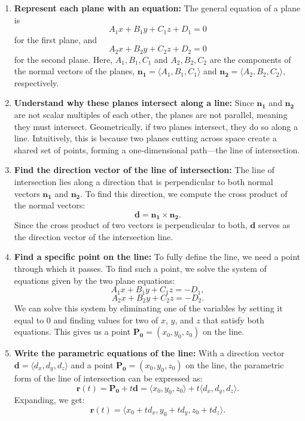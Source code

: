 \begin{enumerate}
    \item \textbf{Represent each plane with an equation:} The general equation of a plane is 
    \[
    A_1 x + B_1 y + C_1 z + D_1 = 0
    \]
    for the first plane, and
    \[
    A_2 x + B_2 y + C_2 z + D_2 = 0
    \]
    for the second plane. Here, \( A_1, B_1, C_1 \) and \( A_2, B_2, C_2 \) are the components of the normal vectors of the planes, \( \mathbf{n_1} = \langle A_1, B_1, C_1 \rangle \) and \( \mathbf{n_2} = \langle A_2, B_2, C_2 \rangle \), respectively.

    \item \textbf{Understand why these planes intersect along a line:} Since \( \mathbf{n_1} \) and \( \mathbf{n_2} \) are not scalar multiples of each other, the planes are not parallel, meaning they must intersect. Geometrically, if two planes intersect, they do so along a line. Intuitively, this is because two planes cutting across space create a shared set of points, forming a one-dimensional path—the line of intersection.

    \item \textbf{Find the direction vector of the line of intersection:} The line of intersection lies along a direction that is perpendicular to both normal vectors \( \mathbf{n_1} \) and \( \mathbf{n_2} \). To find this direction, we compute the cross product of the normal vectors:
    \[
    \mathbf{d} = \mathbf{n_1} \times \mathbf{n_2}.
    \]
    Since the cross product of two vectors is perpendicular to both, \( \mathbf{d} \) serves as the direction vector of the intersection line.

    \item \textbf{Find a specific point on the line:} To fully define the line, we need a point through which it passes. To find such a point, we solve the system of equations given by the two plane equations:
    \[
    A_1 x + B_1 y + C_1 z = -D_1,
    \]
    \[
    A_2 x + B_2 y + C_2 z = -D_2.
    \]
    We can solve this system by eliminating one of the variables by setting it equal to 0 and finding values for two of \( x \), \( y \), and \( z \) that satisfy both equations. This gives us a point \( \mathbf{P_0} = (x_0, y_0, z_0) \) on the line.

    \item \textbf{Write the parametric equations of the line:} With a direction vector \( \mathbf{d} = \langle d_x, d_y, d_z \rangle \) and a point \( \mathbf{P_0} = (x_0, y_0, z_0) \) on the line, the parametric form of the line of intersection can be expressed as:
    \[
    \mathbf{r}(t) = \mathbf{P_0} + t \mathbf{d} = \langle x_0, y_0, z_0 \rangle + t \langle d_x, d_y, d_z \rangle.
    \]
    Expanding, we get:
    \[
    \mathbf{r}(t) = \langle x_0 + t d_x, y_0 + t d_y, z_0 + t d_z \rangle.
    \]
    

\end{enumerate}
